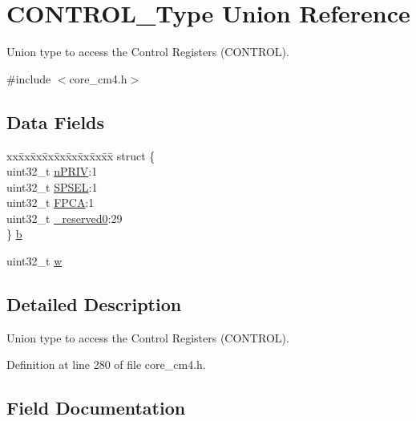\hypertarget{union_c_o_n_t_r_o_l___type}{}\section{C\+O\+N\+T\+R\+O\+L\+\_\+\+Type Union Reference}
\label{union_c_o_n_t_r_o_l___type}


Union type to access the Control Registers (C\+O\+N\+T\+R\+OL).  




{\ttfamily \#include $<$core\+\_\+cm4.\+h$>$}

\subsection*{Data Fields}
\begin{DoxyCompactItemize}
\item 
\begin{tabbing}
xx\=xx\=xx\=xx\=xx\=xx\=xx\=xx\=xx\=\kill
struct \{\\
\>uint32\_t \hyperlink{union_c_o_n_t_r_o_l___type_a2a6e513e8a6bf4e58db169e312172332}{nPRIV}:1\\
\>uint32\_t \hyperlink{union_c_o_n_t_r_o_l___type_ae185aac93686ffc78e998a9daf41415b}{SPSEL}:1\\
\>uint32\_t \hyperlink{union_c_o_n_t_r_o_l___type_a2518558c090f60161ba4e718a54ee468}{FPCA}:1\\
\>uint32\_t \hyperlink{union_c_o_n_t_r_o_l___type_ac8a6a13838a897c8d0b8bc991bbaf7c1}{\_reserved0}:29\\
\} \hyperlink{union_c_o_n_t_r_o_l___type_ab2a41711c248a319c2e7d0ab73c3a8b9}{b}\\

\end{tabbing}\item 
uint32\+\_\+t \hyperlink{union_c_o_n_t_r_o_l___type_ad0fb62e7a08e70fc5e0a76b67809f84b}{w}
\end{DoxyCompactItemize}


\subsection{Detailed Description}
Union type to access the Control Registers (C\+O\+N\+T\+R\+OL). 

Definition at line 280 of file core\+\_\+cm4.\+h.



\subsection{Field Documentation}
\mbox{\label{union_c_o_n_t_r_o_l___type_ac8a6a13838a897c8d0b8bc991bbaf7c1}} 
